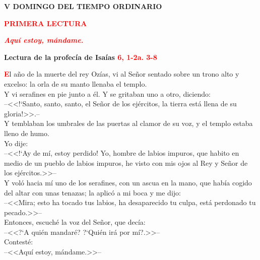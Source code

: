 \documentclass[12pt, letterpaper]{article}
\begin{document}

    \begin{center}
    \Huge {\bfseries V DOMINGO DEL TIEMPO ORDINARIO}
    \end{center}

    \begin{center}
    \Large {\bfseries \textcolor{red}{PRIMERA LECTURA}}
    \end{center}

    \begin{center}
    \large {\bfseries \textit{ \textcolor{red}{Aqu\'i estoy, m\'andame.}}}
    \end{center}

    \Large {\bfseries Lectura de la profec\'ia de  Isa\'ias \hspace{1cm} \textcolor{red}{6, 1-2a. 3-8}}

    \lettrine[lines=2]{\bfseries \textcolor{red}{E}}{}\Large l a\~no de la muerte del rey Oz\'ias, vi al Se\~nor sentado sobre un trono alto y excelso: la orla de su manto llenaba el templo. \\
    Y vi serafines en pie junto a \'el. Y se gritaban uno a otro, diciendo:\\
    --<<!`Santo, santo, santo, el Se\~nor de los ej\'ercitos, la tierra est\'a llena de su gloria!>>.--\\
    Y temblaban los umbrales de las puertas al clamor de su voz, y el templo estaba lleno de humo. \\
    Yo dije:\\
    --<<!`Ay de m\'i, estoy perdido! Yo, hombre de labios impuros, que habito en medio de un pueblo de labios impuros, he visto con mis ojos al Rey y Se\~nor de los ej\'ercitos.>>--\\
    Y vol\'o hacia m\'i uno de los serafines, con un ascua en la mano, que hab\'ia cogido del altar con unas tenazas; la aplic\'o a mi boca y me dijo:\\
    --<<Mira; esto ha tocado tus labios, ha desaparecido tu culpa, est\'a perdonado tu pecado.>>--\\
    Entonces, escuch\'e la voz del Se\~nor, que dec\'ia:\\
    --<<?`A qui\'en mandar\'e? ?`Qui\'en ir\'a por m\'i?.>>--\\
    Contest\'e:\\
    --<<Aqu\'i estoy, m\'andame.>>--
\end{document}
